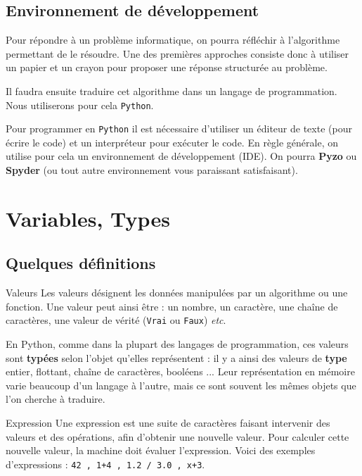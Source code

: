 \subsection{Environnement de développement}
Pour répondre à un problème informatique, on pourra réfléchir à l'algorithme permettant de le résoudre. Une des premières approches consiste donc à utiliser un papier et un crayon pour proposer une réponse structurée au problème.

Il faudra ensuite traduire cet algorithme dans un langage de programmation. Nous utiliserons pour cela \texttt{Python}.

Pour programmer en \texttt{Python} il est nécessaire d'utiliser un éditeur de texte (pour écrire le code) et un interpréteur pour exécuter le code. 
En règle générale, on utilise pour cela un environnement de développement (IDE). On pourra \textbf{Pyzo} ou \textbf{Spyder} (ou tout autre environnement vous paraissant satisfaisant). 

\section{Variables, Types}

\subsection{Quelques définitions}
\begin{defi}{Valeurs}
Les valeurs désignent les données manipulées par un algorithme ou une fonction. Une valeur 
peut ainsi être  : un nombre, un caractère, une chaîne de caractères, une valeur de vérité 
(\texttt{Vrai} ou \texttt{Faux}) \textit{etc}.

En Python, comme dans la plupart des langages de programmation, ces valeurs sont \textbf{typées} selon l'objet qu'elles représentent : il y a ainsi des valeurs de \textbf{type} entier, flottant, chaîne de caractères, booléens ...   Leur représentation en mémoire varie beaucoup d'un langage à l'autre, mais ce sont souvent les mêmes objets que l'on 
cherche à traduire.
\end{defi}

\begin{defi}{Expression }
Une expression est une suite de caractères faisant intervenir des valeurs et des 
opérations, afin d'obtenir une nouvelle valeur. Pour calculer cette nouvelle valeur,
la machine doit {évaluer} l'expression. Voici des exemples d'expressions : \texttt{42 , 1+4 , 
1.2 / 3.0 , x+3}.

\end{defi}


